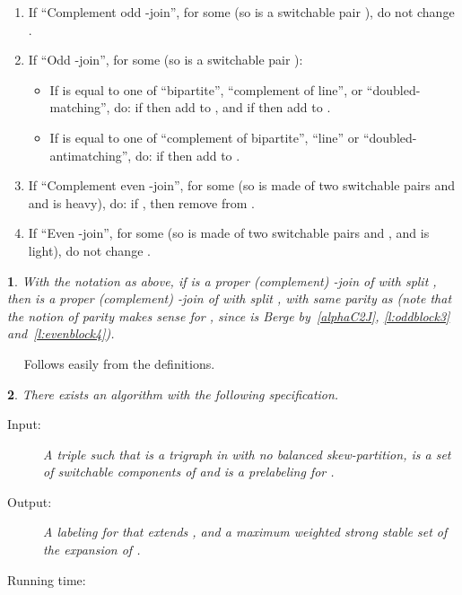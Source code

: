 \documentclass[11 pt] {article}
\newcommand\blackslug{\hbox{\hskip 1pt \vrule width 4pt height 8pt depth 1.5pt
        \hskip 1pt}}
\newcommand\bbox{\hfill \quad \blackslug \medbreak}
\newtheorem{theorem}{}[section]
\newcounter{claim}
\newcommand{\Proof}{\setcounter{claim}{0}\noindent{\bf Proof.}\ \ }
\begin{document}
\begin{enumerate}
\item If ``Complement odd -join'',  for some  (so  is a switchable pair ), do not change .


\item If  ``Odd -join'',  for some  (so  is a switchable pair
  ): 
  \begin{itemize}  
  \item If  is equal to one of ``bipartite'', ``complement of
    line'', or ``doubled-matching'', do: 
    if  then add  to , and if  then add  to .

\item If  is equal to one of ``complement of bipartite'',
    ``line'' or ``doubled-antimatching'', do:  
    if  then add  to .
\end{itemize}

\item If ``Complement even -join'',  for some  (so  is made of two switchable pairs
   and  and  is heavy), do: if , then remove  from .

\item If ``Even -join'',  for some  (so  is made of two
  switchable pairs  and , and  is light), do not change .

\end{enumerate}




\begin{theorem}
  \label{l:expDec}
  With the notation as above, if  is a proper (complement)
  -join of  with split , then
   is a proper (complement) -join of  with split
  , with same parity as  (note that the notion of parity makes sense for , since
   is Berge by~\ref{alphaC2J}, \ref{l:oddblock3} and~\ref{l:evenblock4}).
\end{theorem}

\Proof
Follows easily from the definitions. 
\bbox


\begin{theorem}
  \label{mainAlg}
  There exists an algorithm with the following specification.
  \begin{description}
  \item[Input:] A triple  such that  is a
    trigraph in  with no balanced skew-partition,  is
    a set of switchable components of  and  is a
    prelabeling for .
  \item[Output:] A labeling  for  that
    extends , and a maximum weighted strong stable set of the
    expansion of .
    \item[Running time:]  
  \end{description}
\end{theorem}
\end{document}
